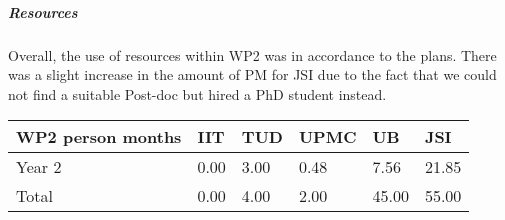 \subparagraph{Resources}
Overall, the use of resources within WP2 was in accordance to the plans. There was a slight increase in the amount of PM for JSI due to the fact that we could not find a suitable Post-doc but hired a PhD student instead.

\begin{center}
\begin{tabular}{|C{1.5cm}|C{1.5cm}|C{1.5cm}|C{2cm}|C{2cm}|C{2cm}|}
\hline
\footnotesize \textbf{WP2 person months}& \footnotesize \textbf{IIT}&\footnotesize \textbf{TUD}&\footnotesize \textbf{UPMC}& \footnotesize \textbf{UB} &\footnotesize \textbf{JSI}\\ \hline
\footnotesize Year 2 &     0.00& 3.00 & 0.48 & 7.56 & 21.85   \\  \hline
\footnotesize Total &  0.00     & 4.00 & 2.00 & 45.00 & 55.00 \\ \hline
\end{tabular}
\end{center}
